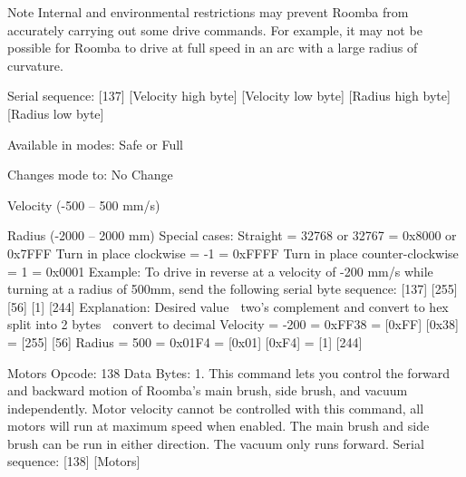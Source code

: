 \begin{Desc}
\begin{description}
\begin{DoxyNote}{Note}
Internal and environmental restrictions may prevent Roomba from accurately carrying out some drive commands. For example, it may not be possible for Roomba to drive at full speed in an arc with a large radius of curvature.
\begin{DoxyItemize}
\item Serial sequence\+: \mbox{[}137\mbox{]} \mbox{[}Velocity high byte\mbox{]} \mbox{[}Velocity low byte\mbox{]} \mbox{[}Radius high byte\mbox{]} \mbox{[}Radius low byte\mbox{]}
\item Available in modes\+: Safe or Full
\item Changes mode to\+: No Change
\item Velocity (-\/500 – 500 mm/s)
\item Radius (-\/2000 – 2000 mm) Special cases\+: Straight = 32768 or 32767 = 0x8000 or 0x7\+F\+F\+F Turn in place clockwise = -\/1 = 0x\+F\+F\+F\+F Turn in place counter-\/clockwise = 1 = 0x0001 Example\+: To drive in reverse at a velocity of -\/200 mm/s while turning at a radius of 500mm, send the following serial byte sequence\+: \mbox{[}137\mbox{]} \mbox{[}255\mbox{]} \mbox{[}56\mbox{]} \mbox{[}1\mbox{]} \mbox{[}244\mbox{]} Explanation\+: Desired value  two’s complement and convert to hex  split into 2 bytes  convert to decimal Velocity = -\/200 = 0x\+F\+F38 = \mbox{[}0x\+F\+F\mbox{]} \mbox{[}0x38\mbox{]} = \mbox{[}255\mbox{]} \mbox{[}56\mbox{]} Radius = 500 = 0x01\+F4 = \mbox{[}0x01\mbox{]} \mbox{[}0x\+F4\mbox{]} = \mbox{[}1\mbox{]} \mbox{[}244\mbox{]} 
\end{DoxyItemize}
\end{DoxyNote}
\item[{\em 
\hypertarget{group__roomba-lib_gga305e17dfb7050ad83ea49ded2e6a2e24a7afe27d88fb8c345d23402faff25a6e3}{}R\+O\+O\+M\+B\+A\+\_\+\+M\+O\+T\+O\+R\+S\label{group__roomba-lib_gga305e17dfb7050ad83ea49ded2e6a2e24a7afe27d88fb8c345d23402faff25a6e3}
}]Motors Opcode\+: 138 Data Bytes\+: 1. This command lets you control the forward and backward motion of Roomba’s main brush, side brush, and vacuum independently. Motor velocity cannot be controlled with this command, all motors will run at maximum speed when enabled. The main brush and side brush can be run in either direction. The vacuum only runs forward. Serial sequence\+: \mbox{[}138\mbox{]} \mbox{[}Motors\mbox{]}

\end{description}
\end{Desc}
